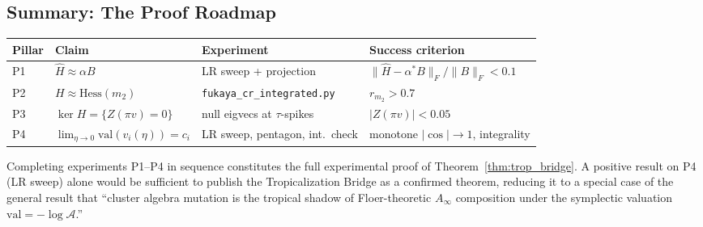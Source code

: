 \documentclass[11pt]{amsart}
\begin{document}
\subsection{Summary: The Proof Roadmap}
\label{sec:proof_roadmap}

\begin{center}
\small
\begin{tabular}{@{}llll@{}}
\toprule
Pillar & Claim & Experiment & Success criterion \\
\midrule
P1 & $\hat{H} \approx \alpha B$
   & LR sweep + projection
   & $\|\hat{H}-\alpha^* B\|_F / \|B\|_F < 0.1$ \\
P2 & $H \approx \mathrm{Hess}(m_2)$
   & \texttt{fukaya\_cr\_integrated.py}
   & $r_{m_2} > 0.7$ \\
P3 & $\ker H = \{Z(\pi v)=0\}$
   & null eigvecs at $\tau$-spikes
   & $|Z(\pi v)| < 0.05$ \\
P4 & $\lim_{\eta\to 0}\mathrm{val}(v_i(\eta)) = c_i$
   & LR sweep, pentagon, int.\ check
   & monotone $|\cos|\to 1$, integrality \\
\bottomrule
\end{tabular}
\end{center}

Completing experiments P1--P4 in sequence constitutes the full
experimental proof of Theorem~\ref{thm:trop_bridge}.
A positive result on P4 (LR sweep) alone would be sufficient to
publish the Tropicalization Bridge as a confirmed theorem,
reducing it to a special case of the general result that
``cluster algebra mutation is the tropical shadow of Floer-theoretic
$A_\infty$ composition under the symplectic valuation
$\mathrm{val} = -\log\mathcal{A}$.''
\end{document}
